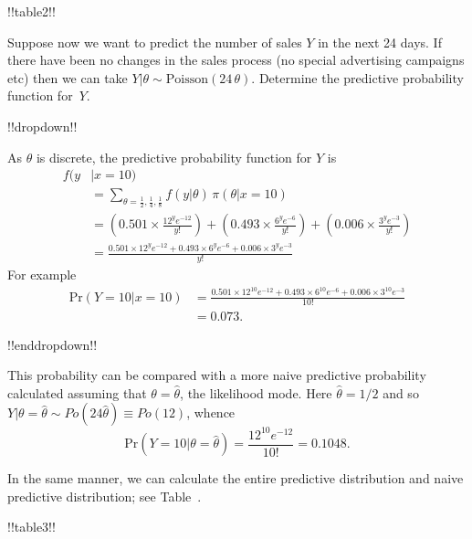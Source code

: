 {!!table2!!

Suppose now we want to predict the number of sales $Y$ in the next 24
days. If there have been no changes in the sales process (no special
advertising campaigns etc) then we can take $Y|\theta\sim
\mathrm{Poisson}(24\,\theta)$. Determine the predictive probability function for~$Y$.



\clearpage

!!dropdown!!

As $\theta$ is discrete, the predictive probability
        function for $Y$ is
        \begin{align*}
        f(y&|x=10)\\
        &=\sum_{\theta=\frac{1}{2},\frac{1}{4},\frac{1}{8}} 
        f(y|\theta)\,\pi(\theta|x=10) \\
        &=\left(0.501\times\frac{12^ye^{-12}}{y!}\right) +
        \left(0.493\times\frac{6^ye^{-6}}{y!}\right)+
        \left(0.006\times\frac{3^ye^{-3}}{y!}\right) \\
        &=\frac{0.501\times 12^ye^{-12}+0.493\times 6^ye^{-6}+0.006\times 3^ye^{-3}}
        {y!}
        \end{align*}
        For example
        \begin{align*}
        \text{Pr}(Y=10|x=10)&=
        \frac{0.501\times 12^{10}e^{-12}+0.493\times 6^{10}e^{-6}+
        0.006\times 3^{10}e^{-3}}{10!}\\
        &=0.073.
        \end{align*}

!!enddropdown!!

This probability can be compared with a more naive predictive
probability calculated assuming that $\theta=\hat{\theta}$, the
likelihood mode. Here $\hat{\theta}=1/2$ and so $Y|\theta=\hat{\theta}\sim
Po(24\hat{\theta})\equiv Po(12)$, whence
\begin{equation*}
\text{Pr}(Y=10|\theta=\hat{\theta})=\frac{12^{10} e^{-12}}{10!}=0.1048.
\end{equation*}

In the same manner, we can calculate the entire predictive distribution
and naive predictive distribution; see Table~.





!!table3!!

}
